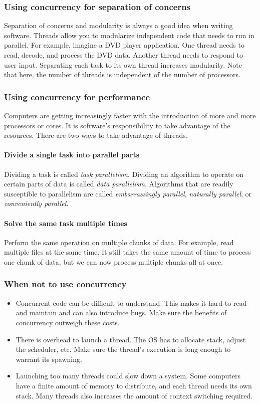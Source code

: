 \subsubsection{Using concurrency for separation of concerns}
Separation of concerns and modularity is always a good idea when writing software. Threads allow you to modularize independent code that needs to run in parallel. For example, imagine a DVD player application. One thread needs to read, decode, and process the DVD data. Another thread needs to respond to user input. Separating each task to its own thread increases modularity. Note that here, the number of threads is independent of the number of processors.

\subsubsection{Using concurrency for performance}
Computers are getting increasingly faster with the introduction of more and more processors or cores. It is software's responsibility to take advantage of the resources. There are two ways to take advantage of threads.

\paragraph{Divide a single task into parallel parts}
Dividing a task is called \emph{task parallelism}. Dividing an algorithm to operate on certain parts of data is called \emph{data parallelism}. Algorithms that are readily susceptible to parallelism are called \emph{embarrassingly parallel}, \emph{naturally parallel}, or \emph{conveniently parallel}.

\paragraph{Solve the same task multiple times}
Perform the same operation on multiple chunks of data. For example, read multiple files at the same time. It still takes the same amount of time to process one chunk of data, but we can now process multiple chunks all at once.

\subsubsection{When not to use concurrency}
\begin{itemize}
  \item Concurrent code can be difficult to understand. This makes it hard to read and maintain and can also introduce bugs. Make sure the benefits of concurrency outweigh these costs.
  \item There is overhead to launch a thread. The OS has to allocate stack, adjust the scheduler, etc. Make sure the thread's execution is long enough to warrant its spawning.
  \item Launching too many threads could slow down a system. Some computers have a finite amount of memory to distribute, and each thread needs its own stack. Many threads also increases the amount of context switching required.
\end{itemize}
  
